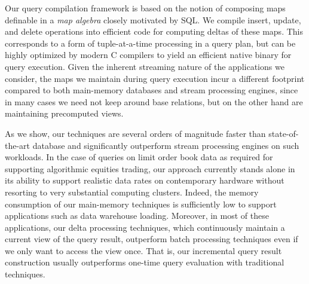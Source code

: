 \medskip







Our query compilation framework is based on the notion of composing maps
definable in a {\em map algebra}\/ closely motivated by SQL.
We compile insert, update, and delete operations into efficient code for computing
deltas of these maps. This corresponds to a form of
tuple-at-a-time processing in a query plan, but can be highly optimized by
modern C compilers to yield an efficient native binary for query execution.
Given the inherent streaming nature of the applications we consider, the maps we
maintain during query execution incur a different footprint compared to both
main-memory databases and stream processing engines, since in many cases we need
not keep around base relations, but on the other hand are maintaining precomputed
views.



As we  show, our techniques are several orders of  magnitude   faster  than
state-of-the-art   database  and significantly outperform stream processing
engines on such workloads.  In the case of queries on limit order  book  data  as
 required for  supporting  algorithmic  equities trading, our approach currently
stands alone in its ability to support realistic  data rates  on contemporary
hardware without  resorting to very substantial computing clusters. Indeed, the
memory consumption of our main-memory techniques is sufficiently low to support
applications such as data warehouse loading. Moreover, in most of these
applications, our delta processing techniques, which continuously maintain a
current view of the query result, outperform batch processing techniques even if
we only want to access the view once. That is, our incremental query result
construction usually outperforms one-time query evaluation with traditional
techniques.





